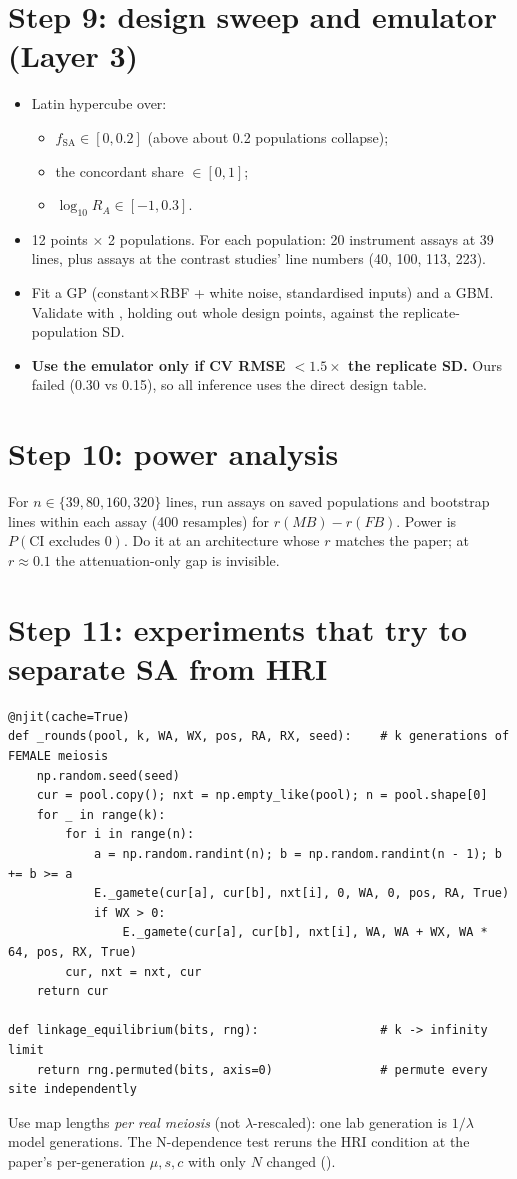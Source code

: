 \section{Step 9: design sweep and emulator (Layer 3)}
\begin{itemize}
\item Latin hypercube over:
  \begin{itemize}
  \item $f_\mathrm{SA}\in[0,0.2]$ (above about 0.2 populations collapse);
  \item the concordant share $\in[0,1]$;
  \item $\log_{10}R_A\in[-1,0.3]$.
  \end{itemize}
\item 12 points $\times$ 2 populations. For each population: 20 instrument assays at 39 lines, plus assays at the contrast studies' line numbers (40, 100, 113, 223).
\item Fit a GP (constant$\times$RBF + white noise, standardised inputs) and a GBM. Validate with , holding out whole design points, against the replicate-population SD.
\item \textbf{Use the emulator only if CV RMSE $<1.5\times$ the replicate SD.} Ours failed (0.30 vs 0.15), so all inference uses the direct design table.
\end{itemize}

\section{Step 10: power analysis}
For $n\in\{39,80,160,320\}$ lines, run assays on saved populations and bootstrap lines within each assay (400 resamples) for $r(MB)-r(FB)$. Power is $P(\text{CI excludes }0)$. Do it at an architecture whose $r$ matches the paper; at $r\approx0.1$ the attenuation-only gap is invisible.

\section{Step 11: experiments that try to separate SA from HRI}
\begin{lstlisting}
@njit(cache=True)
def _rounds(pool, k, WA, WX, pos, RA, RX, seed):    # k generations of FEMALE meiosis
    np.random.seed(seed)
    cur = pool.copy(); nxt = np.empty_like(pool); n = pool.shape[0]
    for _ in range(k):
        for i in range(n):
            a = np.random.randint(n); b = np.random.randint(n - 1); b += b >= a
            E._gamete(cur[a], cur[b], nxt[i], 0, WA, 0, pos, RA, True)
            if WX > 0:
                E._gamete(cur[a], cur[b], nxt[i], WA, WA + WX, WA * 64, pos, RX, True)
        cur, nxt = nxt, cur
    return cur

def linkage_equilibrium(bits, rng):                 # k -> infinity limit
    return rng.permuted(bits, axis=0)               # permute every site independently
\end{lstlisting}
Use map lengths \emph{per real meiosis} (not $\lambda$-rescaled): one lab generation is $1/\lambda$ model generations. The N-dependence test reruns the HRI condition at the paper's per-generation $\mu,s,c$ with only $N$ changed ().

